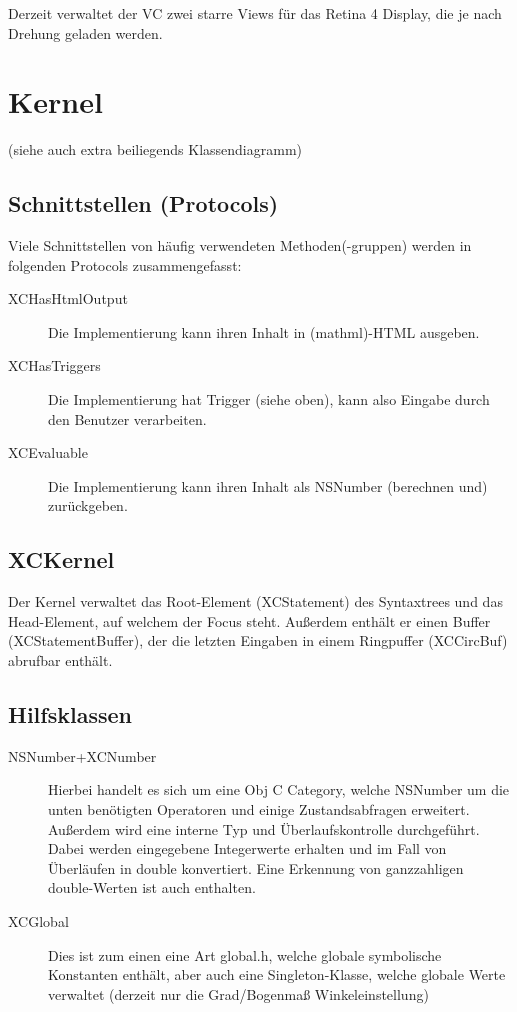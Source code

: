 Derzeit verwaltet der VC zwei starre Views für das Retina 4 Display, die je nach Drehung geladen werden.

\section{Kernel}
(siehe auch extra beiliegends Klassendiagramm)
\subsection{Schnittstellen (Protocols)}
Viele Schnittstellen von häufig verwendeten Methoden(-gruppen) werden in folgenden Protocols zusammengefasst:
\begin{description}
	\item[XCHasHtmlOutput] Die Implementierung kann ihren Inhalt in (mathml)-HTML ausgeben. 
	\item[XCHasTriggers] Die Implementierung hat Trigger (siehe oben), kann also Eingabe durch den Benutzer verarbeiten.
	\item[XCEvaluable] Die Implementierung kann ihren Inhalt als NSNumber (berechnen und) zurückgeben.
\end{description}
\subsection{XCKernel}
Der Kernel verwaltet das Root-Element (XCStatement) des Syntaxtrees und das Head-Element, 
auf welchem der Focus steht. 
Außerdem enthält er einen Buffer (XCStatementBuffer), der die letzten Eingaben in einem Ringpuffer (XCCircBuf) abrufbar enthält.
\subsection{Hilfsklassen}
\begin{description}
	\item[NSNumber+XCNumber] Hierbei handelt es sich um eine Obj C Category, welche NSNumber um die unten benötigten Operatoren und einige Zustandsabfragen erweitert. 
		Außerdem wird eine interne Typ und Überlaufskontrolle durchgeführt. 
		Dabei werden eingegebene Integerwerte erhalten und im Fall von Überläufen in double konvertiert.
	Eine Erkennung von ganzzahligen double-Werten ist auch enthalten.
	\item[XCGlobal] Dies ist zum einen eine Art global.h, welche globale symbolische Konstanten enthält, aber auch eine Singleton-Klasse, welche globale Werte verwaltet (derzeit nur die Grad/Bogenmaß Winkeleinstellung)
\end{description}
